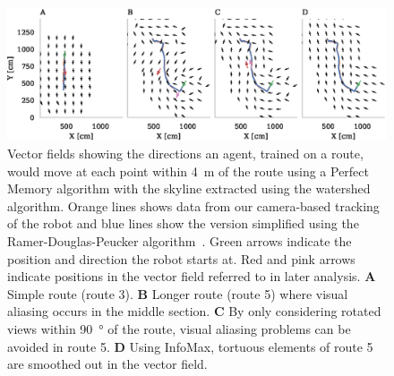 \documentclass[letterpaper]{article}
\begin{document}
\begin{figure}[t]
    \centering
    \includegraphics{figures/vector_field.eps}
    \caption{Vector fields showing the directions an agent, trained on a route, would move at each point within \SI{4}{\metre} of the route using a Perfect Memory algorithm with the skyline extracted using the watershed algorithm. 
    Orange lines shows data from our camera-based tracking of the robot and blue lines show the version simplified using the Ramer-Douglas-Peucker algorithm~\citep{Ramer1972}.
    Green arrows indicate the position and direction the robot starts at.
    Red and pink arrows indicate positions in the vector field referred to in later analysis.
    \textbf{A} Simple route (route 3).
    \textbf{B} Longer route (route 5) where visual aliasing occurs in the middle section.
    \textbf{C} By only considering rotated views within \SI{90}{\degree} of the route, visual aliasing problems can be avoided in route 5.
    \textbf{D} Using InfoMax, tortuous elements of route 5 are smoothed out in the vector field.}
    \label{fig:vector_fields}
\end{figure}
\end{document}
